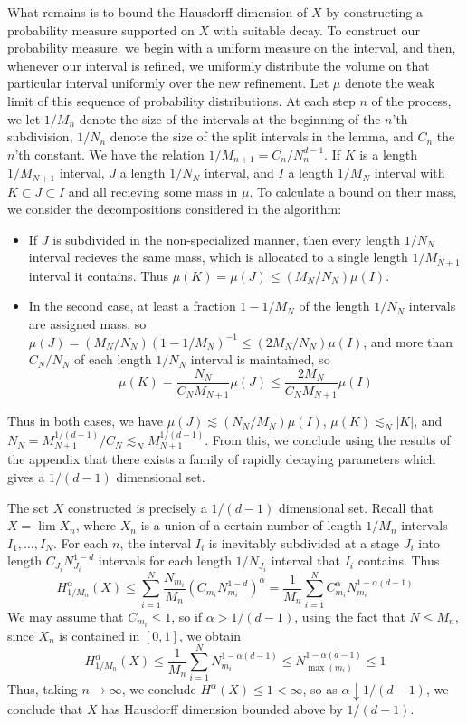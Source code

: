 What remains is to bound the Hausdorff dimension of $X$ by constructing a probability measure supported on $X$ with suitable decay. To construct our probability measure, we begin with a uniform measure on the interval, and then, whenever our interval is refined, we uniformly distribute the volume on that particular interval uniformly over the new refinement. Let $\mu$ denote the weak limit of this sequence of probability distributions. At each step $n$ of the process, we let $1/M_n$ denote the size of the intervals at the beginning of the $n$'th subdivision, $1/N_n$ denote the size of the split intervals in the lemma, and $C_n$ the $n$'th constant. We have the relation $1/M_{n+1} = C_n/N_n^{d-1}$. If $K$ is a length $1/M_{N+1}$ interval, $J$ a length $1/N_N$ interval, and $I$ a length $1/M_N$ interval with $K \subset J \subset I$ and all recieving some mass in $\mu$. To calculate a bound on their mass, we consider the decompositions considered in the algorithm:
%
\begin{itemize}
        \item If $J$ is subdivided in the non-specialized manner, then every length $1/N_N$ interval recieves the same mass, which is allocated to a single length $1/M_{N+1}$ interval it contains. Thus $\mu(K) = \mu(J) \leq (M_N/N_N) \mu(I)$.
        \item In the second case, at least a fraction $1 - 1/M_N$ of the length $1/N_N$ intervals are assigned mass, so $\mu(J) = (M_N/N_N)(1 - 1/M_N)^{-1} \leq (2M_N/N_N) \mu(I)$, and more than $C_N/N_N$ of each length $1/N_N$ interval is maintained, so
        \[ \mu(K) = \frac{N_N}{C_NM_{N+1}} \mu(J) \leq \frac{2M_N}{C_NM_{N+1}} \mu(I) \]
\end{itemize}
%
Thus in both cases, we have $\mu(J) \lesssim (N_N/M_N) \mu(I)$, $\mu(K) \lesssim_N |K|$, and $N_N = M_{N+1}^{1/(d-1)}/C_N \lesssim_N M_{N+1}^{1/(d-1)}$. From this, we conclude using the results of the appendix that there exists a family of rapidly decaying parameters which gives a $1/(d-1)$ dimensional set.

\begin{remark}
    The set $X$ constructed is precisely a $1/(d-1)$ dimensional set. Recall that $X = \lim X_n$, where $X_n$ is a union of a certain number of length $1/M_n$ intervals $I_1, \dots, I_N$. For each $n$, the interval $I_i$ is inevitably subdivided at a stage $J_i$ into length $C_{J_i} N_{J_i}^{1-d}$ intervals for each length $1/N_{J_i}$ interval that $I_i$ contains. Thus
    \[ H_{1/M_n}^\alpha(X) \leq \sum_{i = 1}^N \frac{N_{m_i}}{M_n} (C_{m_i} N_{m_i}^{1-d})^\alpha = \frac{1}{M_n} \sum_{i = 1}^N C_{m_i}^\alpha N_{m_i}^{1 - \alpha(d-1)} \]
    We may assume that $C_{m_i} \leq 1$, so if $\alpha > 1/(d - 1)$, using the fact that $N \leq M_n$, since $X_n$ is contained in $[0,1]$, we obtain
    \[ H_{1/M_n}^\alpha(X) \leq \frac{1}{M_n} \sum_{i = 1}^N N_{m_i}^{1 - \alpha(d-1)} \leq N_{\max(m_i)}^{1 - \alpha(d-1)} \leq 1 \]
    Thus, taking $n \to \infty$, we conclude $H^\alpha(X) \leq 1 < \infty$, so as $\alpha \downarrow 1/(d - 1)$, we conclude that $X$ has Hausdorff dimension bounded above by $1/(d-1)$.
\end{remark}

